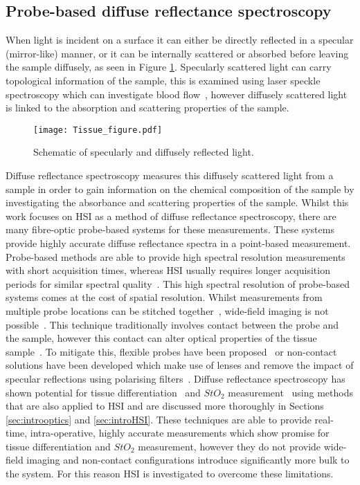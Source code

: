 \subsection{Probe-based diffuse reflectance spectroscopy}
When light is incident on a surface it can either be directly reflected in a specular (mirror-like) manner, or it can be internally scattered or absorbed before leaving the sample diffusely, as seen in Figure \ref{fig:diffuseR}. Specularly scattered light can carry topological information of the sample, this is examined using laser speckle spectroscopy which can investigate blood flow~\citep{Dunn2012}, however diffusely scattered light is linked to the absorption and scattering properties of the sample. 
\begin{figure}[h]
    \centering
    \texttt{[image: Tissue\_figure.pdf]}
    \caption{Schematic of specularly and diffusely reflected light.}
    \label{fig:diffuseR}
\end{figure}
Diffuse reflectance spectroscopy measures this diffusely scattered light from a sample in order to gain information on the chemical composition of the sample by investigating the absorbance and scattering properties of the sample. Whilst this work focuses on HSI as a method of diffuse reflectance spectroscopy, there are many fibre-optic probe-based systems for these measurements. These systems provide highly accurate diffuse reflectance spectra in a point-based measurement. Probe-based methods are able to provide high spectral resolution measurements with short acquisition times, whereas HSI usually requires longer acquisition periods for similar spectral quality~\citep{Dinish2017}. This high spectral resolution of probe-based systems comes at the cost of spatial resolution. Whilst measurements from multiple probe locations can be stitched together~\citep{Thrapp2020}, wide-field imaging is not possible~\citep{Nishidate2015}. This technique traditionally involves contact between the probe and the sample, however this contact can alter optical properties of the tissue sample~\citep{Miller2017}. To mitigate this, flexible probes have been proposed~\citep{Miller2017} or non-contact solutions have been developed which make use of lenses and remove the impact of specular reflections using polarising filters~\citep{Bish2011, Zhu2012}. %
Diffuse reflectance spectroscopy has shown potential for tissue differentiation~\citep{Skyrman2022} and $StO_2$ measurement~\citep{Fredriksson2020} using methods that are also applied to HSI and are discussed more thoroughly in Sections \ref{sec:introoptics} and \ref{sec:introHSI}. These techniques are able to provide real-time, intra-operative, highly accurate measurements which show promise for tissue differentiation and $StO_2$ measurement, however they do not provide wide-field imaging and non-contact configurations introduce significantly more bulk to the system. For this reason HSI is investigated to overcome these limitations. 

